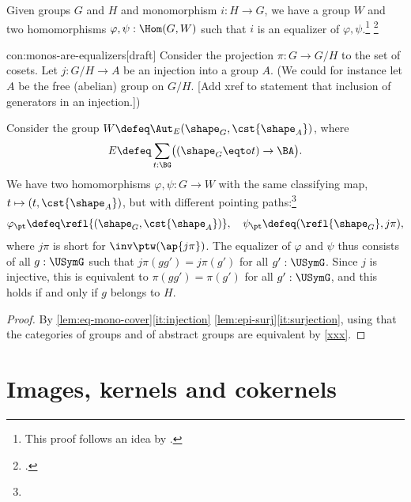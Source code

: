 \begin{construction}\label{con:monos-are-equalizers}
  Given groups $G$ and $H$ and monomorphism $i : H \to G$,
  we have a group $W$ and
  two homomorphisms $\varphi,\psi:\Hom(G,W)$ such that $i$ is an equalizer
  of $\varphi,\psi$.\footnote{%
    This proof follows an idea by \citeauthor{TrimbleEpisSurjective}\footnotemark{}.}%
  \footcitetext{TrimbleEpisSurjective}
\end{construction}
\begin{implementation}{con:monos-are-equalizers}[draft] 
Consider the projection $\pi : G \to G/H$ to the set of cosets.
  Let $j : G/H \to A$ be an injection into a group $A$.
  (We could for instance let $A$ be the free (abelian) group on $G/H$. [Add xref to statement that inclusion of generators in an injection.])

  Consider the group $W \defeq \Aut_E(\sh_G,\cst{\sh_A})$, where
  \[
    E \defeq \sum_{t : \BG}\bigl((\sh_G \eqto t) \to \BA\bigr).
  \]
  We have two homomorphisms $\varphi,\psi : G \to W$ with the same 
  classifying map,
  $t \mapsto (t , \cst{\sh_A})$, but with different pointing paths:\footnote{%
  }
  \[
    \varphi_\pt \defeq \refl{(\sh_G,\cst{\sh_A})}, \quad
    \psi_\pt \defeq (\refl{\sh_G}, j\pi),
  \]
  where $j\pi$ is short for $\inv\ptw(\ap{j\pi})$.
  The equalizer of $\varphi$ and $\psi$ thus consists of all $g:\USymG$
  such that $j\pi(gg') = j\pi(g')$ for all $g':\USymG$. Since $j$ is injective,
  this is equivalent to $\pi(gg')=\pi(g')$ for all $g':\USymG$, and this holds
  if and only if $g$ belongs to $H$.
\end{implementation}

\begin{proof}
By \cref{lem:eq-mono-cover}\ref{it:injection}
\cref{lem:epi-surj}\ref{it:surjection}, 
using that the categories of groups and of abstract
groups are equivalent by \cref{xxx}.
\end{proof}

\section{Images, kernels and cokernels}
\label{subsec:ker}

